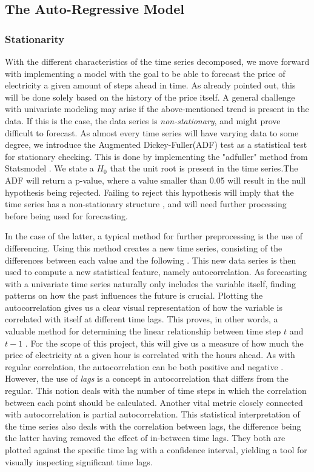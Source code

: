 \documentclass
[twocolumn,
secnumarabic,
nobibnotes,
aps,
prl,
reprint,
groupedaddress,
amsmath,
amssymb,
]{revtex4-2}
\begin{document}
\subsection{The Auto-Regressive Model}

\subsubsection{Stationarity}
With the different characteristics of the time series decomposed, we move forward with implementing a model with the goal to be able to forecast the price of electricity a given amount of steps ahead in time. As already pointed out, this will be done solely based on the history of the price itself. A general challenge with univariate modeling may arise if the above-mentioned trend is present in the data. If this is the case, the data series is \emph{non-stationary}, and might prove difficult to forecast. As almost every time series will have varying data to some degree, we introduce the Augmented Dickey-Fuller(ADF) test as a statistical test for stationary checking. This is done by implementing the "adfuller" method from Statsmodel \cite{seabold2010statsmodels}. We state a $H_0$ that the unit root is present in the time series.The ADF will return a p-value, where a value smaller than 0.05 will result in the null hypothesis being rejected. Failing to reject this hypothesis will imply that the time series has a non-stationary structure \cite{Vishwas2020}, and will need further processing before being used for forecasting.  

In the case of the latter, a typical method for further preprocessing is the use of differencing. Using this method creates a new time series, consisting of the differences between each value and the following \cite{Korstanje2021}. This new data series is then used to compute a new statistical feature, namely autocorrelation. As forecasting with a univariate time series naturally only includes the variable itself, finding patterns on how the past influences the future is crucial. Plotting the autocorrelation gives us a clear visual representation of how the variable is correlated with itself at different time lags. This proves, in other words, a valuable method for determining the linear relationship between time step $t$ and $t-1$ \cite{Vishwas2020}. For the scope of this project, this will give us a measure of how much the price of electricity at a given hour is correlated with the hours ahead. As with regular correlation, the autocorrelation can be both positive and negative \cite{Korstanje2021}. However, the use of \emph{lags} is a concept in autocorrelation that differs from the regular. This notion deals with the number of time steps in which the correlation between each point should be calculated. 
Another vital metric closely connected with autocorrelation is partial autocorrelation. This statistical interpretation of the time series also deals with the correlation between lags, the difference being the latter having removed the effect of in-between time lags\cite{Vishwas2020}. They both are plotted against the specific time lag with a confidence interval, yielding a tool for visually inspecting significant time lags. 
\end{document}

